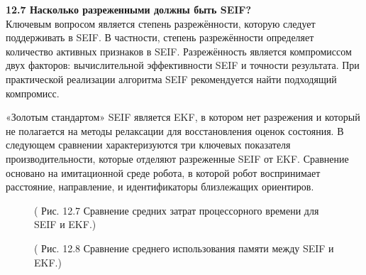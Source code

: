 \documentclass[10pt,a4paper]{article}
\begin{document}
\textbf{12.7	Насколько разреженными должны быть SEIF?}\\

Ключевым вопросом является степень разрежённости, которую следует поддерживать в  SEIF. В частности, степень разрежённости определяет количество активных признаков в SEIF. Разрежённость является компромиссом двух факторов: вычислительной эффективности SEIF и точности результата. При практической реализации алгоритма SEIF рекомендуется найти подходящий компромисс.

«Золотым стандартом» SEIF является EKF, в котором нет разрежения и который не полагается на методы релаксации для восстановления оценок состояния. В следующем сравнении характеризуются три ключевых показателя производительности, которые отделяют разреженные SEIF от EKF. Сравнение основано на имитационной среде робота, в которой робот воспринимает расстояние, направление, и идентификаторы близлежащих ориентиров.

\begin{figure}[H]
	\caption{ ( Рис. 12.7    Сравнение  средних затрат процессорного времени для SEIF и EKF.) }
	\label{fig:127orig}
\end{figure}

\begin{figure}[H]
	\caption{ ( Рис. 12.8    Сравнение среднего использования памяти между SEIF и EKF.) }
	\label{fig:128orig}
\end{figure}
\end{document}
